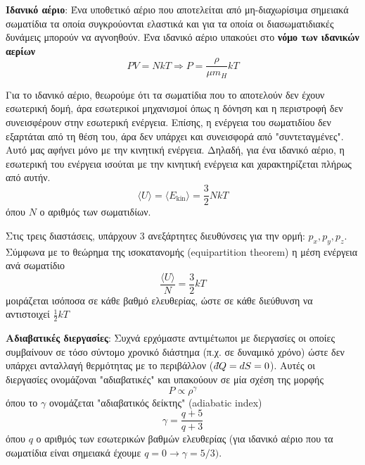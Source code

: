 \textbf{Ιδανικό αέριο}: Ένα υποθετικό αέριο που αποτελείται από μη-διαχωρίσιμα σημειακά σωματίδια τα οποία συγκρούονται ελαστικά και για τα οποία οι διασωματιδιακές δυνάμεις μπορούν να αγνοηθούν. Ένα ιδανικό αέριο υπακούει στο \textbf{νόμο των ιδανικών αερίων}
\begin{equation}
    PV = NkT \Rightarrow P = \frac{\rho}{\mu m_H} kT
\end{equation}

Για το ιδανικό αέριο, θεωρούμε ότι τα σωματίδια που το αποτελούν δεν έχουν εσωτερική δομή, άρα εσωτερικοί μηχανισμοί όπως η δόνηση και η περιστροφή δεν συνεισφέρουν στην εσωτερική ενέργεια. Επίσης, η ενέργεια του σωματιδίου δεν εξαρτάται από τη θέση του, άρα δεν υπάρχει και συνεισφορά από "συντεταγμένες". Αυτό μας αφήνει μόνο με την κινητική ενέργεια. Δηλαδή, για ένα ιδανικό αέριο, η εσωτερική του ενέργεια ισούται με την κινητική ενέργεια και χαρακτηρίζεται πλήρως από αυτήν.
\begin{equation}
    \langle U \rangle = \langle E_{\text{kin}} \rangle = \frac{3}{2} NkT
\end{equation}
όπου $N$ ο αριθμός των σωματιδίων.

Στις τρεις διαστάσεις, υπάρχουν 3 ανεξάρτητες διευθύνσεις για την ορμή: $p_x, p_y, p_z$. Σύμφωνα με το θεώρημα της ισοκατανομής (equipartition theorem) η μέση ενέργεια ανά σωματίδιο
\begin{equation}
    \frac{\langle U \rangle}{N} = \frac{3}{2}kT
\end{equation}
μοιράζεται ισόποσα σε κάθε βαθμό ελευθερίας, ώστε σε κάθε διεύθυνση να αντιστοιχεί $\frac{1}{2}kT$

\textbf{Αδιαβατικές διεργασίες}: Συχνά ερχόμαστε αντιμέτωποι με διεργασίες οι οποίες συμβαίνουν σε τόσο σύντομο χρονικό διάστημα (π.χ. σε δυναμικό χρόνο) ώστε δεν υπάρχει ανταλλαγή θερμότητας με το περιβάλλον ($\dbar Q = dS = 0$). Αυτές οι διεργασίες ονομάζοναι "αδιαβατικές" και υπακούουν σε μία σχέση της μορφής
\begin{equation}
    P \propto \rho^{\gamma} 
\end{equation}
όπου το $\gamma$ ονομάζεται "αδιαβατικός δείκτης" (adiabatic index) 
\begin{equation}
    \gamma = \frac{q+5}{q+3}
\end{equation}
όπου $q$ ο αριθμός των εσωτερικών βαθμών ελευθερίας (για ιδανικό αέριο που τα σωματίδια είναι σημειακά έχουμε $q = 0 \rightarrow \gamma = 5/3)$.

